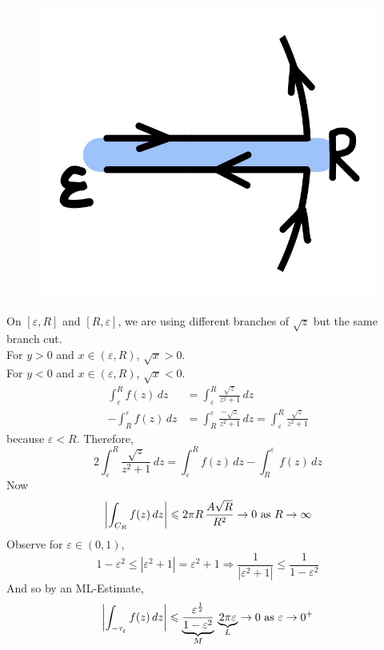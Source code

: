 \documentclass[11pt]{article}
\DeclarePairedDelimiter\abs{\lvert}{\rvert}
\begin{document}
\begin{figure}[h]
\includegraphics[scale=0.08]{21_7} 
\centering
\end{figure} 
On $[\varepsilon, R]$ and $[R, \varepsilon]$, we are using different branches of $\sqrt{z}$ but the same branch cut. \\
For $ y > 0$ and $x \in (\varepsilon, R)$, $\sqrt{x} > 0$. \\
For $ y < 0$ and $x \in (\varepsilon, R)$, $\sqrt{x} < 0$. 
\begin{align*}
\int_{\varepsilon}^{R} f(z) \, dz &= \int_{\varepsilon}^R \frac{\sqrt{z}}{z^2 + 1} \, dz \\
-\int_{R}^{\varepsilon}f(z) \, dz &= \int_{R}^{\varepsilon} \frac{-\sqrt{z}}{z^2 + 1}\,dz = \int_{\varepsilon}^{R}\frac{\sqrt{z}}{z^2 + 1}
\end{align*}
because $\varepsilon < R$. Therefore, 
$$ 2\int_{\varepsilon}^R \frac{\sqrt{z}}{z^2 + 1} \, dz = \int_{\varepsilon}^R f(z) \, dz - \int_{R}^{\varepsilon} f(z) \, dz$$
Now 
$$\abs*{\int_{C_R}f(z)\, dz} \leqslant 2\pi R \, \frac{A\sqrt{R}}{R^2} \to 0 \text{ as } R \to \infty$$ 
Observe for $\varepsilon \in (0, 1)$, 
$$ 1 - \varepsilon^2 \leqslant |\varepsilon^2 + 1| = \varepsilon^2 + 1 \Rightarrow \frac{1}{|\varepsilon^2 + 1|} \leqslant \frac{1}{1 - \varepsilon^2}$$
And so by an ML-Estimate, 
$$\abs*{\int_{-\tau_\varepsilon}f(z) \, dz} \leqslant \underbrace{\frac{\varepsilon^{\frac{1}{2}}}{1 - \varepsilon^2}}_{M} \, \underbrace{2\pi \varepsilon}_{L} \to 0 \text{ as } \varepsilon \to 0^+$$
\end{document}
